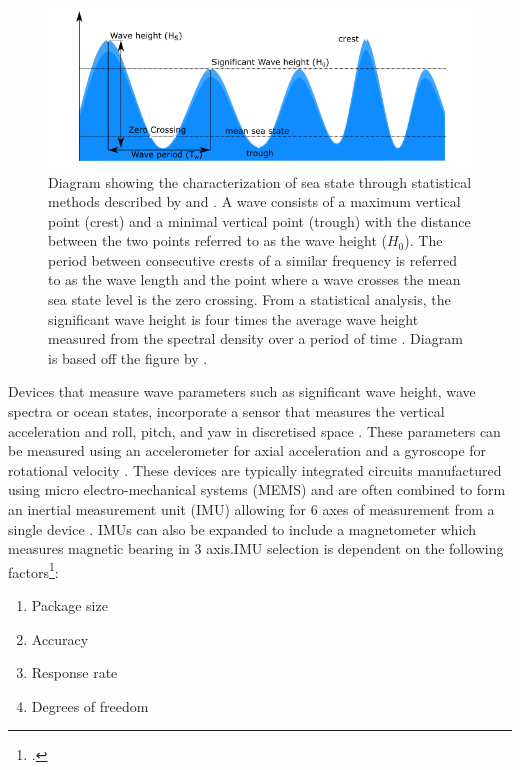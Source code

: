 \begin{figure}[H]
	\centering
	\includegraphics[width=\linewidth]{sea state diagram.png}
	\caption{Diagram showing the characterization of sea state through statistical methods described by \textcite{kuik1988method} and \textcite{earle1996nondirectional,welch1967use}. A wave consists of a maximum vertical point (crest) and a minimal vertical point (trough) with the distance between the two points referred to as the wave height ($H_0$). The period between consecutive crests of a similar frequency is referred to as the wave length and the point where a wave crosses the mean sea state level is the zero crossing. From a statistical analysis, the significant wave height is four times the average wave height measured from the spectral density over a period of time \cite{kuik1988method}. Diagram is based off the figure by \cite{seastatediag}.}
	\label{fig:seastatediag}
\end{figure}

Devices that measure wave parameters such as significant wave height, wave spectra or ocean states, incorporate a sensor that measures the vertical acceleration and roll, pitch, and yaw in discretised space \cite{earle1996nondirectional}. These parameters can be measured using an accelerometer for axial acceleration and a gyroscope for rotational velocity \cite{fong2008methods}. These devices are typically integrated circuits manufactured using micro electro-mechanical systems (MEMS) and are often combined to form an inertial measurement unit (IMU) allowing for 6 axes of measurement from a single device \cite{fong2008methods}. IMUs can also be expanded to include a magnetometer which measures magnetic bearing in 3 axis\cite{ahmad2013reviews}.IMU selection is dependent on the following factors\footcite{ahmad2013reviews}:
\begin{enumerate}
	\item Package size
	\item Accuracy
	\item Response rate
	\item Degrees of freedom
\end{enumerate}

